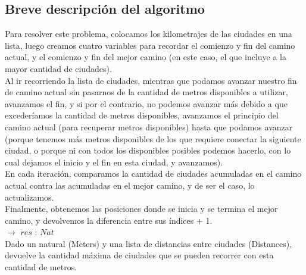 \documentclass{article}
\theoremstyle{definition}
\theoremstyle{remark}
\begin{document}
\subsection{Breve descripción del algoritmo}

Para resolver este problema, colocamos los kilometrajes de las ciudades en una lista, luego creamos cuatro variables para recordar el comienzo y fin del camino actual, y el comienzo y fin del mejor camino (en este caso, el que incluye a la mayor cantidad de ciudades). \\
Al ir recorriendo la lista de ciudades, mientras que podamos avanzar nuestro fin de camino actual sin pasarnos de la cantidad de metros disponibles a utilizar, avanzamos el fin, y si por el contrario, no podemos avanzar más debido a que excederíamos la cantidad de metros disponibles, avanzamos el principio del camino actual (para recuperar metros disponibles) hasta que podamos avanzar (porque tenemos más metros disponibles de los que requiere conectar la siguiente ciudad, o porque ni con todos los disponibles posibles podemos hacerlo, con lo cual dejamos el inicio y el fin en esta ciudad, y avanzamos). \\
En cada iteración, comparamos la cantidad de ciudades acumuladas en el camino actual contra las acumuladas en el mejor camino, y de ser el caso, lo actualizamos. \\
Finalmente, obtenemos las posiciones donde se inicia y se termina el mejor camino, y devolvemos la diferencia entre sus índices + 1. \\

 $\rightarrow$ $res$ :
$Nat$ \\ 
Dado un natural (Meters) y una lista de distancias entre ciudades (Distances), devuelve la cantidad máxima de ciudades que se pueden recorrer con esta cantidad de metros. \\ 
\end{document}

